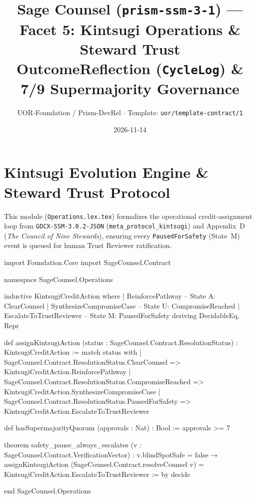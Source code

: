\documentclass[11pt,a4paper]{article}
\title{Sage Counsel (\texttt{prism-ssm-3-1}) --- Facet 5: Kintsugi Operations \& Steward Trust\\
\small OutcomeReflection (\texttt{CycleLog}) \& 7/9 Supermajority Governance}
\author{UOR-Foundation / Prism-DevRel $\cdot$ Template: \texttt{uor/template-contract/1}}
\date{2026-11-14}
\begin{document}
\maketitle

\section{Kintsugi Evolution Engine \& Steward Trust Protocol}
This module (\texttt{Operations.lex.tex}) formalizes the operational credit-assignment loop from \texttt{GDCX-SSM-3.0.2-JSON} (\texttt{meta\_protocol\_kintsugi}) and Appendix~D (\emph{The Council of Nine Stewards}), ensuring every \texttt{PausedForSafety} (State~M) event is queued for human Trust Reviewer ratification.

\begin{code}
import Foundation.Core
import SageCounsel.Contract

namespace SageCounsel.Operations

inductive KintsugiCreditAction where
  | ReinforcePathway         -- State A: ClearCounsel
  | SynthesizeCompromiseCase -- State U: CompromiseReached
  | EscalateToTrustReviewer  -- State M: PausedForSafety
  deriving DecidableEq, Repr

def assignKintsugiAction (status : SageCounsel.Contract.ResolutionStatus) : KintsugiCreditAction :=
  match status with
  | SageCounsel.Contract.ResolutionStatus.ClearCounsel      => KintsugiCreditAction.ReinforcePathway
  | SageCounsel.Contract.ResolutionStatus.CompromiseReached => KintsugiCreditAction.SynthesizeCompromiseCase
  | SageCounsel.Contract.ResolutionStatus.PausedForSafety   => KintsugiCreditAction.EscalateToTrustReviewer

def hasSupermajorityQuorum (approvals : Nat) : Bool :=
  approvals >= 7

theorem safety_pause_always_escalates (v : SageCounsel.Contract.VerificationVector) :
    v.blindSpotSafe = false →
    assignKintsugiAction (SageCounsel.Contract.resolveCounsel v) = KintsugiCreditAction.EscalateToTrustReviewer := by
  decide

end SageCounsel.Operations
\end{code}
\end{document}
